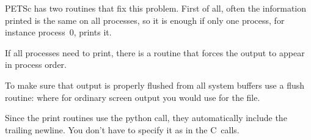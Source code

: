 PETSc has two routines that fix this problem. First of all, often the
information printed is the same on all processes, so it is enough if
only one process, for instance process~0, prints it.
%

If all processes need to print, there is a routine that forces the
output to appear in process order.
%

To make sure that output is properly flushed from all system buffers
use a flush routine:
%
%
where for ordinary screen output you would use  for the file.

\begin{pythonnote}
  Since the print routines use the python  call, they
  automatically include the trailing newline. You don't have to
  specify it as in the C~calls.
\end{pythonnote}

